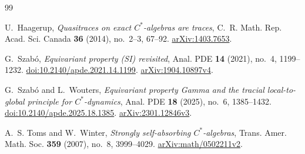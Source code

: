 \begin{samepage}
\begin{thebibliography}{99}
\raggedright

U.~Haagerup,
\emph{Quasitraces on exact \(C^*\)-algebras are traces},
C.~R. Math. Rep. Acad. Sci. Canada \textbf{36} (2014), no.~2--3,
67--92.
\href{https://arxiv.org/abs/1403.7653}{arXiv:1403.7653}.

G.~Szab\'o,
\emph{Equivariant property (SI) revisited},
Anal. PDE \textbf{14} (2021), no.~4, 1199--1232.
\href{https://doi.org/10.2140/apde.2021.14.1199}
{doi:10.2140/apde.2021.14.1199}.
\href{https://arxiv.org/abs/1904.10897v4}{arXiv:1904.10897v4}.

G.~Szab\'o and L.~Wouters,
\emph{Equivariant property Gamma and the tracial local-to-global principle
for \(C^*\)-dynamics},
Anal. PDE \textbf{18} (2025), no.~6, 1385--1432.
\href{https://doi.org/10.2140/apde.2025.18.1385}
{doi:10.2140/apde.2025.18.1385}.
\href{https://arxiv.org/abs/2301.12846v3}{arXiv:2301.12846v3}.

A.~S. Toms and W.~Winter,
\emph{Strongly self-absorbing \(C^*\)-algebras},
Trans. Amer. Math. Soc. \textbf{359} (2007), no.~8, 3999--4029.
\href{https://arxiv.org/abs/math/0502211v2}{arXiv:math/0502211v2}.

\end{thebibliography}
\end{samepage}
